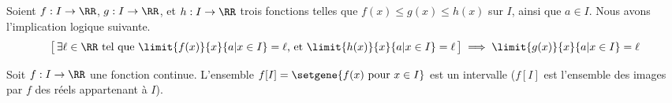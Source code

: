 \begin{fact} \label{lim-cops}
	Soient
	$f: I \to \RR$,
	$g: I \to \RR$,
	et
	$h: I \to \RR$
	trois fonctions telles que
	$f(x) \leq g(x) \leq h(x)$ sur $I$,
	ainsi que
	$a \in I$.
	Nous avons l'implication logique suivante.
	\[
		\big[\,
			\text{$\exists \ell \in \RR$ tel que
			      $\limit{f(x)}{x}{a | x \in I} = \ell$,
			      et
			      $\limit{h(x)}{x}{a | x \in I} = \ell$}
		\,\big]
		\implies
		\limit{g(x)}{x}{a | x \in I} = \ell
	\]
\end{fact}




\begin{fact} \label{tvi}
	Soit
	$f: I \to \RR$ une fonction continue.
	L'ensemble $f[I] = \setgene{f(x) \text{ pour } x \in I}$ est un intervalle ($f[I]$ est l'ensemble des images par $f$ des réels appartenant à $I$).
\end{fact}

